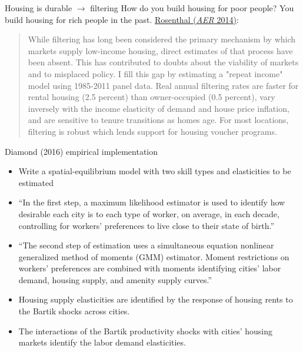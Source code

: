 \documentclass[11pt,notes=hide,aspectratio=169]{beamer}
\begin{document}
\begin{frame}{Housing is durable $\to$ filtering}
How do you build housing for poor people? You build housing for rich people in the past.
\href{https://www.aeaweb.org/articles?id=10.1257/aer.104.2.687}{Rosenthal (\textit{AER} 2014)}:
\begin{quote}{
	While filtering has long been considered the primary mechanism by which markets supply low-income housing, direct estimates of that process have been absent.
	This has contributed to doubts about the viability of markets and to misplaced policy.
	I fill this gap by estimating a "repeat income" model using 1985-2011 panel data.
	Real annual filtering rates are faster for rental housing (2.5 percent) than owner-occupied (0.5 percent), vary inversely with the income elasticity of demand and house price inflation, and are sensitive to tenure transitions as homes age.
	For most locations, filtering is robust which lends support for housing voucher programs.
}\end{quote}
\end{frame}
\begin{frame}{Diamond (2016) empirical implementation}
\begin{itemize}
	\item Write a spatial-equilibrium model with two skill types and elasticities to be estimated
	\item ``In the first step, a maximum likelihood estimator is used to identify how desirable each city is to each type of worker, on average, in each decade, controlling for workers' preferences to live close to their state of birth.''
	\item ``The second step of estimation uses a simultaneous equation nonlinear generalized method of moments (GMM) estimator. Moment restrictions on workers' preferences are combined with moments identifying cities' labor demand, housing supply, and amenity supply curves.''
	\item Housing supply elasticities are identified by the response of housing rents to the Bartik shocks across cities. 
	\item The interactions of the Bartik productivity shocks with cities' housing markets identify the labor demand elasticities.
\end{itemize}
\end{frame}
\end{document}
